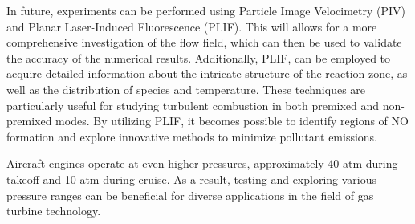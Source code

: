 In future, experiments can be performed using Particle Image Velocimetry (PIV) and Planar Laser-Induced Fluorescence (PLIF). This will allows for a more comprehensive investigation of the flow field, which can then be used to validate the accuracy of the numerical results. Additionally, PLIF, can be employed to acquire detailed information about the intricate structure of the reaction zone, as well as the distribution of species and temperature. These techniques are particularly useful for studying turbulent combustion in both premixed and non-premixed modes. By utilizing PLIF, it becomes possible to identify regions of NO formation and explore innovative methods to minimize pollutant emissions.

Aircraft engines operate at even higher pressures, approximately 40 atm during takeoff and 10 atm during cruise. As a result, testing and exploring various pressure ranges can be beneficial for diverse applications in the field of gas turbine technology.